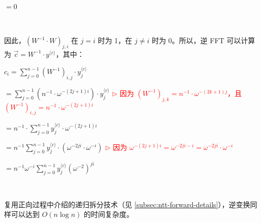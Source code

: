 $= 0$

$ $

因此，$(W^{-1} \cdot W)_{j, i}$ 在 $j = i$ 时为 1，在 $j \neq i$ 时为 0。所以，逆 FFT 可以计算为 $\vec{c} = W^{-1} \cdot y^{\langle c \rangle}$，其中：

$c_i = \sum_{j=0}^{n-1} (W^{-1})_{i,j} \cdot y_j^{\langle c \rangle}$

$ = \sum\limits_{j=0}^{n-1} \left( n^{-1} \cdot \omega^{-(2j+1)i} \right) \cdot y_j^{\langle c \rangle}$ \textcolor{red}{ $\rhd$ 因为 $(W^{-1})_{j,k} = n^{-1} \cdot \omega^{-(2k+1)j}$，且 $(W^{-1})_{i,j} = n^{-1} \cdot \omega^{-(2j+1)i}$}

$ = n^{-1}\cdot \sum\limits_{j=0}^{n-1}{y}_j^{\langle c \rangle} \cdot \omega^{-(2j+1)i}$

$ = n^{-1} \sum\limits_{j=0}^{n-1} y_j^{\langle c \rangle} \cdot (\omega^{-2ji} \cdot \omega^{-i}) $ \textcolor{red}{ $\rhd$ 因为 $\omega^{-(2j+1)i} = \omega^{-2ji - i} = \omega^{-2ji} \cdot \omega^{-i}$}

$= n^{-1} \omega^{-i} \sum\limits_{j=0}^{n-1} {y}_j^{\langle c \rangle} (\omega^{-2})^{ji}$

$ $


复用正向过程中介绍的递归拆分技术（见 \autoref{subsec:ntt-forward-details}），逆变换同样可以达到 $O(n \log n)$ 的时间复杂度。

